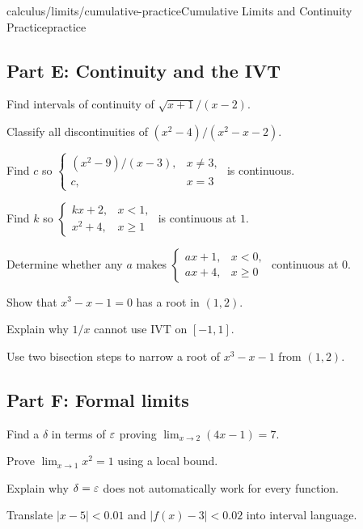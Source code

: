 \begin{webpage}{calculus/limits/cumulative-practice}{Cumulative Limits and Continuity Practice}{practice}
\subsection*{Part E: Continuity and the IVT}
\begin{bgexercises}[label=\textbf{R\arabic*.},resume]
  \item Find intervals of continuity of \(\sqrt{x+1}/(x-2)\).
  \item Classify all discontinuities of \((x^2-4)/(x^2-x-2)\).
  \item Find \(c\) so \(\begin{cases}(x^2-9)/(x-3),&x\ne3,\\c,&x=3\end{cases}\) is continuous.
  \item Find \(k\) so \(\begin{cases}kx+2,&x<1,\\x^2+4,&x\ge1\end{cases}\) is continuous at \(1\).
  \item Determine whether any \(a\) makes \(\begin{cases}ax+1,&x<0,\\ax+4,&x\ge0\end{cases}\) continuous at \(0\).
  \item Show that \(x^3-x-1=0\) has a root in \((1,2)\).
  \item Explain why \(1/x\) cannot use IVT on \([-1,1]\).
  \item Use two bisection steps to narrow a root of \(x^3-x-1\) from \((1,2)\).
\end{bgexercises}

\subsection*{Part F: Formal limits}
\begin{bgexercises}[label=\textbf{R\arabic*.},resume]
  \item Find a \(\delta\) in terms of \(\varepsilon\) proving \(\lim_{x\to2}(4x-1)=7\).
  \item Prove \(\lim_{x\to1}x^2=1\) using a local bound.
  \item Explain why \(\delta=\varepsilon\) does not automatically work for every function.
  \item Translate \(|x-5|<0.01\) and \(|f(x)-3|<0.02\) into interval language.
\end{bgexercises}
\end{webpage}

